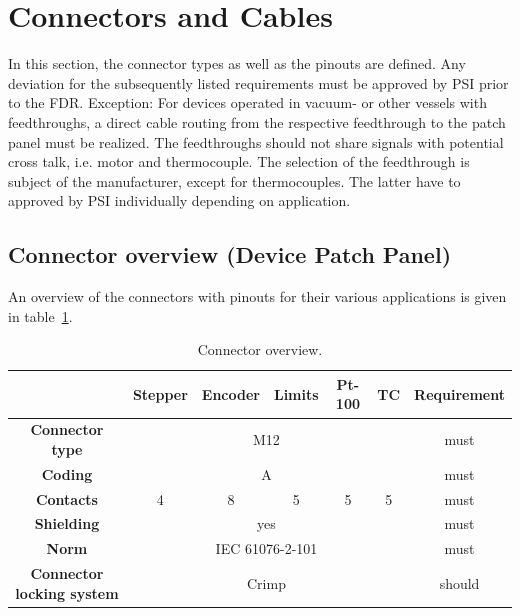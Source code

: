\pagebreak
\section{Connectors and Cables}

In this section, the connector types as well as the pinouts are defined.
Any deviation for the subsequently listed requirements must be approved by PSI prior to the FDR.
Exception: For devices operated in vacuum- or other vessels with feedthroughs, a direct cable routing from the respective feedthrough to the patch panel must be realized.
The feedthroughs should not share signals with potential cross talk, i.e. motor and thermocouple.
The selection of the feedthrough is subject of the manufacturer, except for thermocouples.
The latter have to approved by PSI individually depending on application.

\subsection{Connector overview (Device Patch Panel)}

An overview of the connectors with pinouts for their various applications is given in table~\ref{tab:connectorOverview}.

\begin{table}[!htb]
\caption{\label{tab:connectorOverview}Connector overview.}
\begin{minipage}{\linewidth}
\centering
\begin{tabular}{|c|c|c|c|c|c|c|}
\hline
\textbf{}                         & \textbf{Stepper} & \textbf{Encoder} & \textbf{Limits} & \textbf{Pt-100} & \textbf{TC}\footnotemark & \textbf{Requirement} \\ \hline
\textbf{Connector type}           & \multicolumn{5}{c|}{M12}                                                              & must                 \\ \hline
\textbf{Coding}                   & \multicolumn{5}{c|}{A}                                                                & must                 \\ \hline
\textbf{Contacts}                 & 4                & 8                & 5               & 5               & 5           & must                 \\ \hline
\textbf{Shielding}                & \multicolumn{5}{c|}{yes}                                                              & must                 \\ \hline
\textbf{Norm}                     & \multicolumn{5}{c|}{IEC 61076-2-101}                                                   & must                 \\ \hline
\textbf{Connector locking system} & \multicolumn{5}{c|}{Crimp}                                                            & should               \\ \hline
\end{tabular}
\end{minipage}
\end{table}

